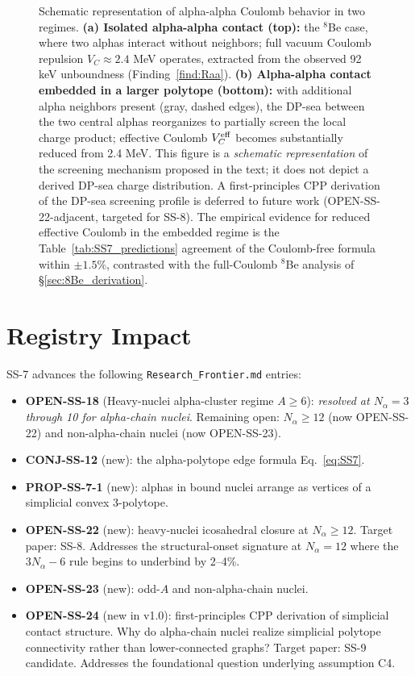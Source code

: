 \documentclass[11pt,letterpaper]{article}
\newcommand{\Nalpha}{N_{\alpha}}
\begin{document}
\begin{figure}[H]
\begin{tikzpicture}[scale=1.25]
\end{tikzpicture}
\caption{Schematic representation of alpha-alpha Coulomb behavior in two regimes. \textbf{(a) Isolated alpha-alpha contact (top):} the ${}^8$Be case, where two alphas interact without neighbors; full vacuum Coulomb repulsion $V_C \approx 2.4$ MeV operates, extracted from the observed 92 keV unboundness (Finding~\ref{find:Raa}). \textbf{(b) Alpha-alpha contact embedded in a larger polytope (bottom):} with additional alpha neighbors present (gray, dashed edges), the DP-sea between the two central alphas reorganizes to partially screen the local charge product; effective Coulomb $V_C^{\rm eff}$ becomes substantially reduced from 2.4 MeV. This figure is a \emph{schematic representation} of the screening mechanism proposed in the text; it does not depict a derived DP-sea charge distribution. A first-principles CPP derivation of the DP-sea screening profile is deferred to future work (OPEN-SS-22-adjacent, targeted for SS-8). The empirical evidence for reduced effective Coulomb in the embedded regime is the Table~\ref{tab:SS7_predictions} agreement of the Coulomb-free formula within $\pm 1.5\%$, contrasted with the full-Coulomb ${}^8$Be analysis of \S\ref{sec:8Be_derivation}.}
\label{fig:dpsea_schematic}
\end{figure}

\section{Registry Impact}
\label{sec:registry}

SS-7 advances the following \texttt{Research\_Frontier.md} entries:
\begin{itemize}
\item \textbf{OPEN-SS-18} (Heavy-nuclei alpha-cluster regime $A \geq 6$): \emph{resolved at $\Nalpha = 3$ through 10 for alpha-chain nuclei}. Remaining open: $\Nalpha \geq 12$ (now OPEN-SS-22) and non-alpha-chain nuclei (now OPEN-SS-23).
\item \textbf{CONJ-SS-12} (new): the alpha-polytope edge formula Eq.~\ref{eq:SS7}.
\item \textbf{PROP-SS-7-1} (new): alphas in bound nuclei arrange as vertices of a simplicial convex 3-polytope.
\item \textbf{OPEN-SS-22} (new): heavy-nuclei icosahedral closure at $\Nalpha \geq 12$. Target paper: SS-8. Addresses the structural-onset signature at $\Nalpha = 12$ where the $3\Nalpha - 6$ rule begins to underbind by 2--4\%.
\item \textbf{OPEN-SS-23} (new): odd-$A$ and non-alpha-chain nuclei.
\item \textbf{OPEN-SS-24} (new in v1.0): first-principles CPP derivation of simplicial contact structure. Why do alpha-chain nuclei realize simplicial polytope connectivity rather than lower-connected graphs? Target paper: SS-9 candidate. Addresses the foundational question underlying assumption C4.
\end{itemize}
\end{document}
